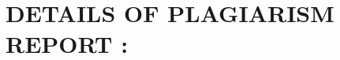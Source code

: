 \documentclass[12,Times new Roman,a4paper]{report}
\begin{document}
\section{DETAILS OF PLAGIARISM REPORT :}

% 
\end{document}
